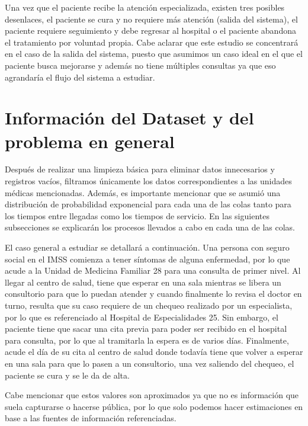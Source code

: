 \documentclass[10pt]{article}
\begin{document}
    Una vez que el paciente recibe la atención especializada, existen tres posibles desenlaces, el paciente se cura y no requiere más atención (salida del sistema), el paciente requiere seguimiento y debe regresar al hospital o el paciente abandona el tratamiento por voluntad propia. Cabe aclarar que este estudio se concentrará en el caso de la salida del sistema, puesto que asumimos un caso ideal en el que el paciente busca mejorarse y además no tiene múltiples consultas ya que eso agrandaría el flujo del sistema a estudiar.

    \section{Información del Dataset y del problema en general}
    Después de realizar una limpieza básica para eliminar datos innecesarios y registros vacíos, filtramos únicamente los datos correspondientes a las unidades médicas mencionadas. Además, es importante mencionar que se asumió una distribución de probabilidad exponencial para cada una de las colas tanto para los tiempos entre llegadas como los tiempos de servicio. En las siguientes subsecciones se explicarán los procesos llevados a cabo en cada una de las colas. \par
    El caso general a estudiar se detallará a continuación. Una persona con seguro social en el IMSS comienza a tener síntomas de alguna enfermedad, por lo que acude a la Unidad de Medicina Familiar 28 para una consulta de primer nivel. Al llegar al centro de salud, tiene que esperar en una sala mientras se libera un consultorio para que lo puedan atender y cuando finalmente lo revisa el doctor en turno, resulta que su caso requiere de un chequeo realizado por un especialista, por lo que es referenciado al Hospital de Especialidades 25. Sin embargo, el paciente tiene que sacar una cita previa para poder ser recibido en el hospital para consulta, por lo que al tramitarla la espera es de varios días. Finalmente, acude el día de su cita al centro de salud donde todavía tiene que volver a esperar en una sala para que lo pasen a un consultorio, una vez saliendo del chequeo, el paciente se cura y se le da de alta. \par
    Cabe mencionar que estos valores son aproximados ya que no es información que suela capturarse o hacerse pública, por lo que solo podemos hacer estimaciones en base a las fuentes de información referenciadas. \par
    
\end{document}
